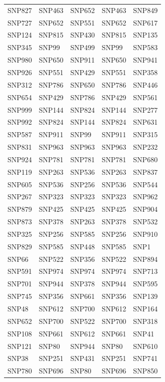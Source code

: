 \begin{table}[ht]
\begin{tabular}{lllll}
  SNP827 & SNP463 & SNP652 & SNP463 & SNP849 \\ 
  SNP727 & SNP652 & SNP551 & SNP652 & SNP617 \\ 
  SNP124 & SNP815 & SNP430 & SNP815 & SNP135 \\ 
  SNP345 & SNP99 & SNP499 & SNP99 & SNP583 \\ 
  SNP980 & SNP650 & SNP911 & SNP650 & SNP941 \\ 
  SNP926 & SNP551 & SNP429 & SNP551 & SNP358 \\ 
  SNP312 & SNP786 & SNP650 & SNP786 & SNP446 \\ 
  SNP654 & SNP429 & SNP786 & SNP429 & SNP561 \\ 
  SNP999 & SNP144 & SNP824 & SNP144 & SNP277 \\ 
  SNP992 & SNP824 & SNP144 & SNP824 & SNP631 \\ 
  SNP587 & SNP911 & SNP99 & SNP911 & SNP315 \\ 
  SNP831 & SNP963 & SNP963 & SNP963 & SNP232 \\ 
  SNP924 & SNP781 & SNP781 & SNP781 & SNP680 \\ 
  SNP119 & SNP263 & SNP536 & SNP263 & SNP837 \\ 
  SNP605 & SNP536 & SNP256 & SNP536 & SNP544 \\ 
  SNP267 & SNP323 & SNP323 & SNP323 & SNP962 \\ 
  SNP879 & SNP425 & SNP425 & SNP425 & SNP904 \\ 
  SNP873 & SNP378 & SNP263 & SNP378 & SNP532 \\ 
  SNP325 & SNP256 & SNP585 & SNP256 & SNP910 \\ 
  SNP829 & SNP585 & SNP448 & SNP585 & SNP1 \\ 
  SNP66 & SNP522 & SNP356 & SNP522 & SNP894 \\ 
  SNP591 & SNP974 & SNP974 & SNP974 & SNP713 \\ 
  SNP701 & SNP944 & SNP378 & SNP944 & SNP595 \\ 
  SNP745 & SNP356 & SNP661 & SNP356 & SNP139 \\ 
  SNP48 & SNP612 & SNP700 & SNP612 & SNP164 \\ 
  SNP652 & SNP700 & SNP522 & SNP700 & SNP318 \\ 
  SNP108 & SNP661 & SNP612 & SNP661 & SNP41 \\ 
  SNP121 & SNP80 & SNP944 & SNP80 & SNP610 \\ 
  SNP38 & SNP251 & SNP431 & SNP251 & SNP741 \\ 
  SNP780 & SNP696 & SNP80 & SNP696 & SNP850 \\ 

\end{tabular}
\end{table}
